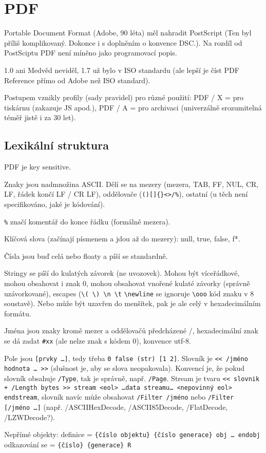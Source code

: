 \documentclass[12pt]{article}					%
\begin{document}
\section{PDF}
    \begin{poznamka}[Historie]
        Portable Document Format (Adobe, 90 léta) měl nahradit PostScript (Ten byl příliš komplikovaný. Dokonce i s doplněním o konvence DSC.). Na rozdíl od PostSciptu PDF není míněno jako programovací popis.

        1.0 ani Medvěd neviděl, 1.7 už bylo v ISO standardu (ale lepší je číst PDF Reference přímo od Adobe než ISO standard).

        Postupem vznikly profily (sady pravidel) pro různé použití: PDF / X = pro tiskárnu (zakazuje JS apod.), PDF / A = pro archivaci (univerzálně srozumitelná téměř jistě i za 30 let).
    \end{poznamka}
    
    \subsection{Lexikální struktura}
        \begin{definice}
            PDF je key sensitive.

            Znaky jsou nadmnožina ASCII. Dělí se na mezery (mezera, TAB, FF, NUL, CR, LF, řádek končí LF / CR LF), oddělovače (\verb|()[]{}<>/%|), ostatní (u těch není specifikováno, jaké je kódování).
        
            \verb|%| značí komentář do konce řádku (formálně mezera).

            Klíčová slova (začínají písmenem a jdou až do mezery): null, true, false, f*.

            Čísla jsou buď celá nebo floaty a píší se standardně.

            Stringy se píší do kulatých závorek (ne uvozovek). Mohou být víceřádkové, mohou obsahovat i znak 0, mohou obsahovat vnořené kulaté závorky (správně uzávorkované), escapes (\verb|\( \) \n \t| \verb|\newline| se ignoruje \verb|\ooo| kód znaku v 8 soustavě). Nebo může být uzavřen do menšítek, pak je ale celý v hexadecimálním formátu.

            Jména jsou znaky kromě mezer a oddělovačů předcházené /, hexadecimální znak se dá zadat \verb|#xx| (ale nelze znak s kódem 0), konvence utf-8.

            Pole jsou \verb|[prvky …]|, tedy třeba \verb|0 false (str) [1 2]|. Slovník je \verb|<< /jméno hodnota … >>| (slušnost je, aby se slova neopakovala). Konvencí je, že pokud slovník obsahuje \verb|/Type|, tak je správně, např. \verb|/Page|. Stream je tvaru \verb|<< slovnik + /Length bytes >> stream <eol> …data streamu… <nepovinný eol> endstream|, slovník navíc může obsahovat \verb|/Filter /jméno| nebo \verb|/Filter [/jméno …]| (např. /ASCIIHexDecode, /ASCII85Decode, /FlatDecode, /LZWDecode?).

            Nepřímé objekty: definice = \verb|{číslo objektu} {číslo generace} obj … endobj| odkazování se = \verb|{číslo} {generace} R|
        \end{definice}
    
\end{document}
